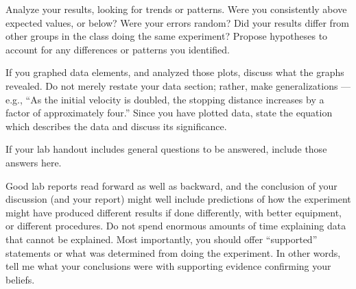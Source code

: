 \documentclass[11pt,letterpaper]{article}
\begin{document}
Analyze your results, looking for trends or patterns.  Were you consistently above expected values, or below?  Were your errors random?  Did your results differ from other groups in the class doing the same experiment? Propose hypotheses to account for any differences or patterns you identified.

If you graphed data elements, and analyzed those plots, discuss what the graphs revealed.  Do not merely restate your data section; rather, make generalizations --- e.g., ``As the initial velocity is doubled, the stopping distance increases by a factor of approximately four.'' Since you have plotted data, state the equation which describes the data and discuss its significance.

If your lab handout includes general questions to be answered, include those answers here.

Good lab reports read forward as well as backward, and the conclusion of your discussion (and your report) might well include predictions of how the experiment might have produced different results if done differently, with better equipment, or different procedures. Do not spend enormous amounts of time explaining data that cannot be explained. Most importantly, you should offer ``supported'' statements or what was determined from doing the experiment. In other words, tell me what your conclusions were with supporting evidence confirming your beliefs.

 
\end{document}
